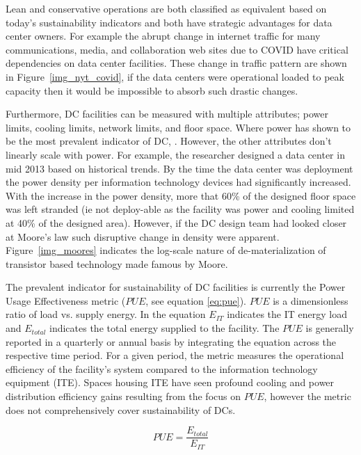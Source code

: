     Lean and conservative operations are both classified as equivalent based on today's sustainability indicators and both have strategic advantages for data center owners. For example the abrupt change in internet traffic for many communications, media, and collaboration web sites due to COVID have critical dependencies on data center facilities. These change in traffic pattern are shown in Figure~\ref{img_nyt_covid}, if the data centers were operational loaded to peak capacity then it would be impossible to absorb such drastic changes.
    
    
    
    Furthermore, DC facilities can be measured with multiple attributes; power limits, cooling limits, network limits, and floor space. Where power has shown to be the most prevalent indicator of DC, \cite{barroso18}. However, the other attributes don't linearly scale with power. For example, the researcher designed a data center in mid 2013 based on historical trends. By the time the data center was deployment the power density per information technology devices had significantly increased. With the increase in the power density, more that 60\% of the designed floor space was left stranded (ie not deploy-able as the facility was power and cooling limited at 40\% of the designed area). However, if the DC design team had looked closer at Moore's law such disruptive change in density were apparent. Figure~\ref{img_moores} indicates the log-scale nature of de-materialization of transistor based technology made famous by Moore.
    
    
    
    The prevalent indicator for sustainability of DC facilities is currently the Power Usage Effectiveness metric ($PUE$, see equation \ref{eq:pue}). $PUE$ is a dimensionless ratio of load vs. supply energy.   In the equation $E_{IT}$ indicates the IT energy load and $E_{total}$ indicates the total energy supplied to the facility. The $PUE$ is generally reported in a quarterly or annual basis by integrating the equation across the respective time period. For a given period, the metric measures the operational efficiency of the facility's system compared to the information technology equipment (ITE). Spaces housing ITE have seen profound cooling and power distribution efficiency gains resulting from the focus on $PUE$, however the metric does not comprehensively cover sustainability of DCs.
    
    \begin{equation} \label{eq:pue}
    PUE=\frac{E_{total}}{E_{IT}} 
    \end{equation}
    
